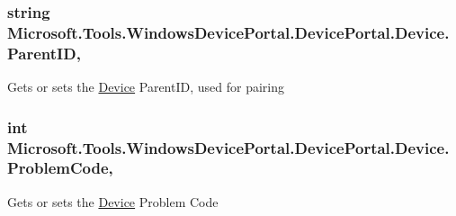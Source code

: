 \subsubsection[{\texorpdfstring{Parent\+ID}{ParentID}}]{\setlength{\rightskip}{0pt plus 5cm}string Microsoft.\+Tools.\+Windows\+Device\+Portal.\+Device\+Portal.\+Device.\+Parent\+ID\hspace{0.3cm}{\ttfamily [get]}, {\ttfamily [set]}}\hypertarget{class_microsoft_1_1_tools_1_1_windows_device_portal_1_1_device_portal_1_1_device_a7e0bf4bc507fae55dd0f829f3cf12e3f}{}\label{class_microsoft_1_1_tools_1_1_windows_device_portal_1_1_device_portal_1_1_device_a7e0bf4bc507fae55dd0f829f3cf12e3f}


Gets or sets the \hyperlink{class_microsoft_1_1_tools_1_1_windows_device_portal_1_1_device_portal_1_1_device}{Device} Parent\+ID, used for pairing 

\subsubsection[{\texorpdfstring{Problem\+Code}{ProblemCode}}]{\setlength{\rightskip}{0pt plus 5cm}int Microsoft.\+Tools.\+Windows\+Device\+Portal.\+Device\+Portal.\+Device.\+Problem\+Code\hspace{0.3cm}{\ttfamily [get]}, {\ttfamily [set]}}\hypertarget{class_microsoft_1_1_tools_1_1_windows_device_portal_1_1_device_portal_1_1_device_a11d9ee51375f9d3781ba700dbb6b6d8b}{}\label{class_microsoft_1_1_tools_1_1_windows_device_portal_1_1_device_portal_1_1_device_a11d9ee51375f9d3781ba700dbb6b6d8b}


Gets or sets the \hyperlink{class_microsoft_1_1_tools_1_1_windows_device_portal_1_1_device_portal_1_1_device}{Device} Problem Code 

